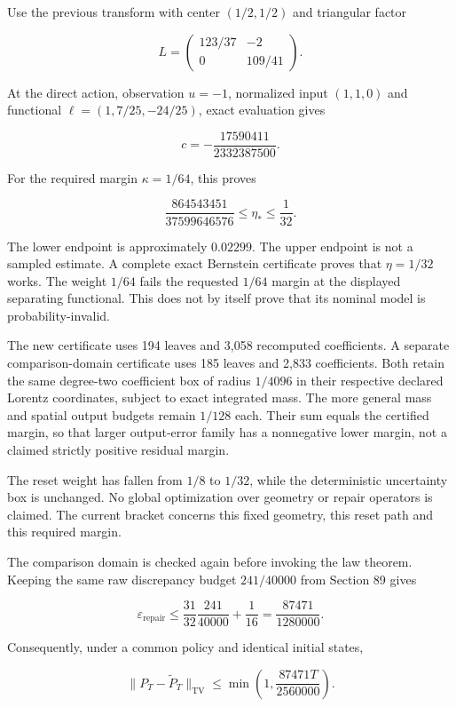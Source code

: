 Use the previous transform with center \((1/2,1/2)\) and triangular
factor

\[
L=\begin{pmatrix}123/37&-2\\0&109/41\end{pmatrix}.
\]

At the direct action, observation \(u=-1\), normalized input \((1,1,0)\)
and functional \(\ell=(1,7/25,-24/25)\), exact evaluation gives

\[
c=-\frac{17590411}{2332387500}.
\]

For the required margin \(\kappa=1/64\), this proves

\[
\frac{864543451}{37599646576}
\leq\eta_*\leq\frac1{32}.
\]

The lower endpoint is approximately \(0.02299\). The upper endpoint is
not a sampled estimate. A complete exact Bernstein certificate proves
that \(\eta=1/32\) works. The weight \(1/64\) fails the requested
\(1/64\) margin at the displayed separating functional. This does not by
itself prove that its nominal model is probability-invalid.

The new certificate uses 194 leaves and 3,058 recomputed coefficients. A
separate comparison-domain certificate uses 185 leaves and 2,833
coefficients. Both retain the same degree-two coefficient box of radius
\(1/4096\) in their respective declared Lorentz coordinates, subject to
exact integrated mass. The more general mass and spatial output budgets
remain \(1/128\) each. Their sum equals the certified margin, so that
larger output-error family has a nonnegative lower margin, not a claimed
strictly positive residual margin.

The reset weight has fallen from \(1/8\) to \(1/32\), while the
deterministic uncertainty box is unchanged. No global optimization over
geometry or repair operators is claimed. The current bracket concerns
this fixed geometry, this reset path and this required margin.

The comparison domain is checked again before invoking the law theorem.
Keeping the same raw discrepancy budget \(241/40000\) from Section 89
gives

\[
\varepsilon_{\mathrm{repair}}
\leq\frac{31}{32}\frac{241}{40000}+\frac1{16}
=\frac{87471}{1280000}.
\]

Consequently, under a common policy and identical initial states,

\[
\boxed{
\|P_T-\widetilde P_T\|_{\mathrm{TV}}
\leq\min\left(1,\frac{87471T}{2560000}\right).
}
\]

